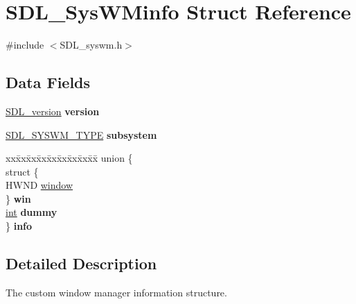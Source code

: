 \hypertarget{struct_s_d_l___sys_w_minfo}{}\section{S\+D\+L\+\_\+\+Sys\+W\+Minfo Struct Reference}
\label{struct_s_d_l___sys_w_minfo}


{\ttfamily \#include $<$S\+D\+L\+\_\+syswm.\+h$>$}

\subsection*{Data Fields}
\begin{DoxyCompactItemize}
\item 
\hyperlink{struct_s_d_l__version}{S\+D\+L\+\_\+version} {\bfseries version}\hypertarget{struct_s_d_l___sys_w_minfo_a4aaa8edb964920f77d969c6c08537476}{}\label{struct_s_d_l___sys_w_minfo_a4aaa8edb964920f77d969c6c08537476}

\item 
\hyperlink{_s_d_l__syswm_8h_a064c26598287280fff2a00d6758ac4f7}{S\+D\+L\+\_\+\+S\+Y\+S\+W\+M\+\_\+\+T\+Y\+PE} {\bfseries subsystem}\hypertarget{struct_s_d_l___sys_w_minfo_a5d89c66a940596db3ebdc1664d634c38}{}\label{struct_s_d_l___sys_w_minfo_a5d89c66a940596db3ebdc1664d634c38}

\item 
\begin{tabbing}
xx\=xx\=xx\=xx\=xx\=xx\=xx\=xx\=xx\=\kill
union \{\\
\>struct \{\\
\>\>HWND \hyperlink{struct_s_d_l___sys_w_minfo_a773143cded4dde4b20b2c5dc501a5b51}{window}\\
\>\} {\bfseries win}\\
\>\hyperlink{_s_d_l__thread_8h_a6a64f9be4433e4de6e2f2f548cf3c08e}{int} {\bfseries dummy}\\
\} {\bfseries info}\hypertarget{struct_s_d_l___sys_w_minfo_a26dfab6cf39acdb4aa84a5cd8e7ff0ee}{}\label{struct_s_d_l___sys_w_minfo_a26dfab6cf39acdb4aa84a5cd8e7ff0ee}
\\

\end{tabbing}\end{DoxyCompactItemize}


\subsection{Detailed Description}
The custom window manager information structure.

